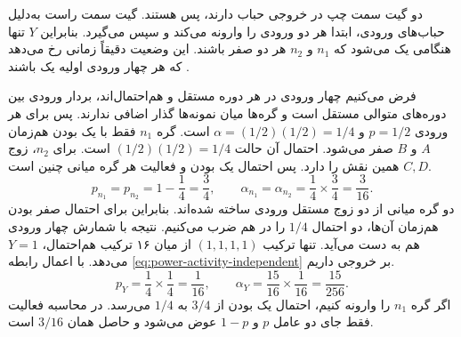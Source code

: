 دو گیت سمت چپ در خروجی حباب دارند، پس  هستند.
گیت سمت راست به‌دلیل حباب‌های ورودی، ابتدا هر دو ورودی را
وارونه می‌کند و سپس  می‌گیرد. بنابراین \(Y\) تنها
هنگامی یک می‌شود که \(n_1\) و \(n_2\) هر دو صفر باشند.
این وضعیت دقیقاً زمانی رخ می‌دهد که هر چهار ورودی اولیه یک باشند
\cite[مثال ۵.۲ و شکل ، صفحات ۱۸۷ و ۱۸۸]{weste}.

فرض می‌کنیم چهار ورودی در هر دوره مستقل و هم‌احتمال‌اند،
بردار ورودی بین دوره‌های متوالی مستقل است و گره‌ها میان
نمونه‌ها گذار اضافی ندارند. پس برای هر ورودی \(p=1/2\)
و \(\alpha=(1/2)(1/2)=1/4\) است. گره \(n_1\) فقط با یک بودن
هم‌زمان \(A\) و \(B\) صفر می‌شود. احتمال آن حالت
\((1/2)(1/2)=1/4\) است. برای \(n_2\)، زوج \(C,D\) همین نقش را
دارد. پس احتمال یک بودن و فعالیت هر گره میانی چنین است.
\[
  p_{n_1}=p_{n_2}=1-\frac14=\frac34,\qquad
  \alpha_{n_1}=\alpha_{n_2}=\frac14\times\frac34=\frac{3}{16}.
\]
دو گره میانی از دو زوج مستقل ورودی ساخته شده‌اند. بنابراین برای
احتمال صفر بودن هم‌زمان آن‌ها، دو احتمال \(1/4\) را در هم ضرب
می‌کنیم. نتیجه با شمارش چهار ورودی هم به دست می‌آید. تنها ترکیب
\((1,1,1,1)\) از میان ۱۶ ترکیب هم‌احتمال، \(Y=1\) می‌دهد.
با اعمال رابطه \eqref{eq:power-activity-independent} بر خروجی داریم.
\[
  p_Y=\frac14\times\frac14=\frac{1}{16},\qquad
  \alpha_Y=\frac{15}{16}\times\frac{1}{16}=\frac{15}{256}.
\]
اگر گره \(n_1\) را وارونه کنیم، احتمال یک بودن از \(3/4\) به
\(1/4\) می‌رسد. در محاسبه فعالیت فقط جای دو عامل
\(p\) و \(1-p\) عوض می‌شود و حاصل همان \(3/16\) است.
